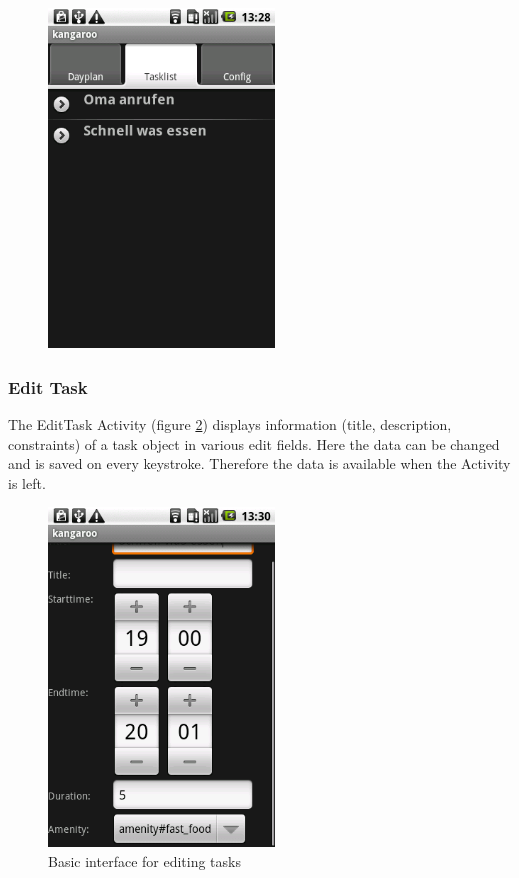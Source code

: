 \begin{figure}[h!]
    \centering
    \includegraphics[width=6cm]{pics/gui/task_main.png}
    \caption{}
    \label{}
\end{figure}


\subsubsection{Edit Task} %
\label{ssub:EditTask}
The EditTask Activity (figure \ref{img:taskedit}) displays information
(title, description, constraints)
of a task object in various edit fields. Here the data can be changed and
is saved on every keystroke. Therefore the data is available when the
Activity is left.

\begin{figure}[h!]
    \centering
    \includegraphics[width=6cm]{pics/gui/task_edit.png}
    \caption{Basic interface for editing tasks}
    \label{img:taskedit}
\end{figure}

